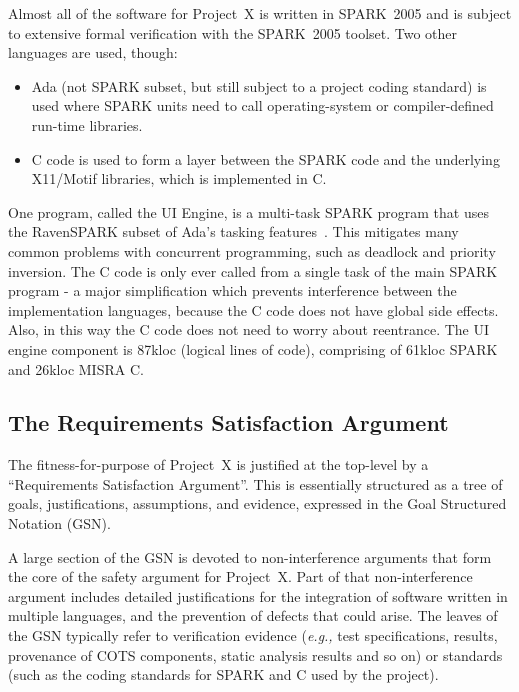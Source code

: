 \documentclass{llncs}
\newcommand{\oldspark}{SPARK~2005\xspace}
\newcommand{\spark}{SPARK\xspace}
\newcommand{\projectx}{Project~X\xspace}
\newcommand{\eg}{\textit{e.g.,}\xspace}
\begin{document}
Almost all of the software for \projectx is written in \oldspark
and is subject to extensive formal verification with the \oldspark
toolset.  Two other languages are used, though:

\begin{itemize}
\item Ada (not \spark subset, but still subject to a
project coding standard) is used where \spark units
need to call operating-system or compiler-defined run-time
libraries.

\item C code is used to form a layer between
the \spark code and the underlying X11/Motif libraries,
which is implemented in C.
\end{itemize}

One program, called the UI Engine, is a multi-task
\spark program that uses the RavenSPARK subset of Ada's
tasking features~\cite{sparkbook2012}.
This mitigates many common problems with concurrent programming, such
as deadlock and priority inversion. The C code is only ever called
from a single task of the main \spark program - a major
simplification which prevents interference between the
implementation languages, because the C code does not have global side
effects. Also, in this way the C code does not need to worry about reentrance.
The UI engine component is 87kloc (logical lines of code),
comprising of 61kloc \spark and 26kloc MISRA C.

\subsection{The Requirements Satisfaction Argument}

The fitness-for-purpose of \projectx is justified at the
top-level by a ``Requirements Satisfaction Argument''. This is
essentially structured as a tree of goals, justifications, assumptions,
and evidence, expressed in the Goal Structured Notation (GSN).

A large section of the GSN is devoted to non-interference arguments
that form the core of the safety argument for \projectx.  Part of that
non-interference argument includes detailed justifications for the
integration of software written in multiple languages, and the
prevention of defects that could arise. The leaves of the GSN typically
refer to verification evidence (\eg test specifications, results,
provenance of COTS components, static analysis results and so on)
or standards (such as the coding standards for \spark and C used by the project).
\end{document}
